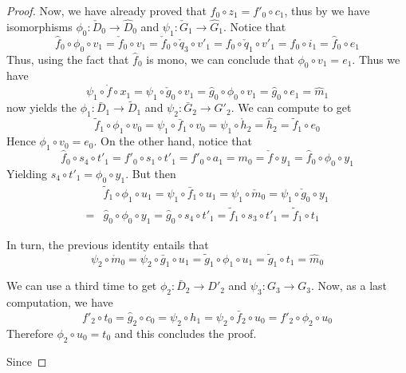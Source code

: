 \documentclass[a4paper,UKenglish,cleveref,pdftex,thm-restate,numberwithinsect]{lipics-v2021}
\begin{document}
\begin{proof}
	Now, we have already proved that $f_0\circ z_1=f'_0\circ c_1$, thus by  we have isomorphisms $\phi_{0}\colon \check{D}_0\to \hat{D}_0$ and $\psi_{1}\colon \check{G}_1\to \hat{G}_1$.
	Notice that
	\[
	\hat{f}_0\circ \phi_{0}\circ v_1  = \check{f}_0\circ v_1 =\check{f}_0\circ \check{q}_3\circ v'_1=f_0\circ \check{q}_1\circ v'_1=f_0\circ i_1=\hat{f}_0\circ e_1\]
	Thus, using the fact that $\hat{f}_0$ is mono, we can conclude that $\phi_0\circ v_1=e_1$. Thus we have
	\[\psi_1\circ \mathring{f}\circ x_1=\psi_1\circ \check{g}_0\circ v_1= \hat{g}_0\circ \phi_0\circ v_1=\hat{g}_0\circ e_1=\hat{m}_1 \]
	 now yields the $\phi_1\colon \bar{D}_1\to\tilde{D}_1$ and $\psi_2\colon \bar{G}_2\to G'_2$.  We can compute to get
	\[
	\tilde{f}_1\circ \phi_1\circ v_0=\psi_1\circ \bar{f}_1\circ v_0=\psi_1\circ \mathring{h}_2=\hat{h}_2=\tilde{f}_1\circ e_0\]
	Hence $\phi_1\circ v_0=e_0$. On the other hand, notice that
	\[\hat{f}_0\circ s_4\circ t'_1=f'_0\circ s_1\circ t'_1=f'_0\circ a_1=m_0=\check{f}\circ y_1=\hat{f}_0\circ \phi_0\circ y_1\]
	Yielding $s_4\circ t'_1=\phi_0\circ y_1$. But then
	\begin{align*}
		&\tilde{f}_1\circ \phi_1\circ u_1=\psi_1\circ \bar{f}_1\circ u_1=\psi_1\circ \check{m}_0= \psi_1\circ \check{g}_0\circ y_1\\=&\hat{g}_0\circ \phi_0\circ y_1=\hat{g}_0\circ s_4\circ t'_1=\tilde{f}_1\circ s_3\circ t'_1=\tilde{f}_1\circ t_1 
	\end{align*}
	
	In turn, the previous identity entails that
	\[\psi_2\circ \mathring{m}_0=\psi_2\circ \bar{g}_1\circ u_1 = \tilde{g}_1\circ \phi_1\circ u_1 = \tilde{g}_1\circ t_1=\hat{m}_0\]
	
	We can use  a third time to get $\phi_2\colon \bar{D}_2\to D'_2$ and $\psi_3\colon G_3\to G_3$.  Now, as a last computation, we have
	\[f'_2\circ t_0= \hat{g}_2\circ c_0=\psi_2\circ h_1=\psi_2\circ \bar{f}_2\circ u_0=f'_2\circ \phi_2\circ u_0\]
	Therefore $\phi_2\circ u_0=t_0$ and this concludes the proof.
	
	Since 
	
\end{proof}
\end{document}
